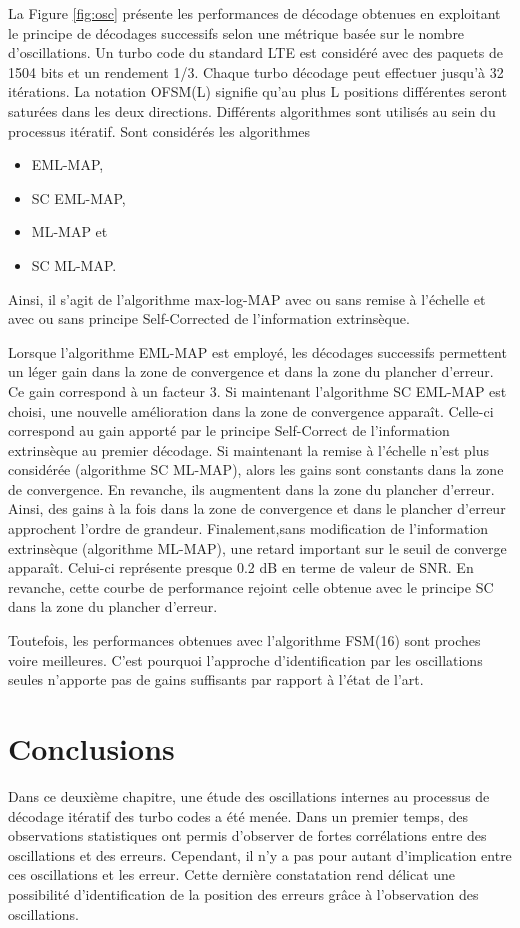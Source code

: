La Figure \ref{fig:osc} présente les performances de décodage obtenues en exploitant le principe de décodages successifs selon une 
métrique basée sur le nombre d'oscillations. Un turbo code du standard LTE est considéré avec des paquets de 1504 bits et un 
rendement 1/3. Chaque turbo décodage peut effectuer jusqu'à 32 itérations. La notation OFSM(L) signifie qu'au plus L 
positions différentes seront saturées dans les deux directions. Différents algorithmes sont utilisés au sein du
processus itératif. Sont considérés les algorithmes 
\begin{itemize}
 	\item EML-MAP,
 	\item SC EML-MAP,
 	\item ML-MAP et 
 	\item SC ML-MAP.
 \end{itemize} 
 Ainsi, il s'agit de l'algorithme 
max-log-MAP avec ou sans remise à l'échelle et avec ou sans principe Self-Corrected de l'information extrinsèque.

Lorsque l'algorithme EML-MAP est employé, les décodages successifs permettent un léger gain dans la zone de convergence 
et dans la zone du plancher d'erreur. Ce gain correspond à un facteur 3. Si maintenant l'algorithme SC EML-MAP 
est  choisi, une nouvelle amélioration dans la zone de convergence apparaît. Celle-ci correspond au gain apporté par le 
principe Self-Correct de l'information extrinsèque au premier décodage. Si maintenant la remise à l'échelle n'est plus 
considérée (algorithme SC ML-MAP), alors les gains sont constants dans la zone de convergence. En revanche, ils augmentent dans 
la zone du plancher d'erreur. Ainsi, des gains à la fois dans la zone de convergence et dans le plancher d'erreur 
approchent l'ordre de grandeur. Finalement,sans modification de l'information extrinsèque 
(algorithme ML-MAP), une retard important sur le seuil de converge apparaît. Celui-ci représente presque 0.2 dB en terme 
de valeur de SNR. En revanche, cette courbe de performance rejoint celle obtenue avec le principe SC dans la zone du 
plancher d'erreur. 

Toutefois, les performances obtenues avec l'algorithme FSM(16) sont proches voire meilleures. C'est pourquoi l'approche 
d'identification par les oscillations seules n'apporte pas de gains suffisants par rapport à l'état de l'art.

\section{Conclusions}
Dans ce deuxième chapitre, une étude des oscillations internes au processus de décodage itératif des turbo codes a été 
menée. Dans un premier temps, des observations statistiques ont permis d'observer de fortes corrélations entre des oscillations
et des erreurs. Cependant, il n'y a pas pour autant d'implication entre ces oscillations et les erreur. Cette dernière constatation 
rend délicat une possibilité d'identification de la position des erreurs grâce à l'observation des oscillations.


